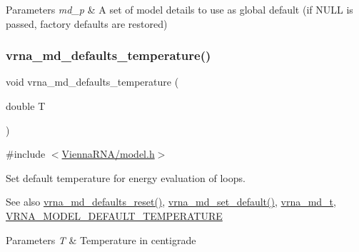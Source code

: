 \begin{DoxyParams}{Parameters}
{\em md\+\_\+p} & A set of model details to use as global default (if N\+U\+LL is passed, factory defaults are restored) \\
\hline
\end{DoxyParams}
\mbox{\label{group__model__details_gaf9e527e9a2f7e6fd6e42bc6e602f5445}} 
\subsubsection{\texorpdfstring{vrna\_md\_defaults\_temperature()}{vrna\_md\_defaults\_temperature()}}
{\footnotesize\ttfamily void vrna\+\_\+md\+\_\+defaults\+\_\+temperature (\begin{DoxyParamCaption}\item[{double}]{T }\end{DoxyParamCaption})}



{\ttfamily \#include $<$\mbox{\hyperlink{model_8h}{Vienna\+R\+N\+A/model.\+h}}$>$}



Set default temperature for energy evaluation of loops. 

\begin{DoxySeeAlso}{See also}
\mbox{\hyperlink{group__model__details_ga70834424cf804d149937de89f80ceb45}{vrna\+\_\+md\+\_\+defaults\+\_\+reset()}}, \mbox{\hyperlink{group__model__details_ga8ac6ff84936282436f822644bf841f66}{vrna\+\_\+md\+\_\+set\+\_\+default()}}, \mbox{\hyperlink{group__model__details_ga1f8a10e12a0a1915f2a4eff0b28ea17c}{vrna\+\_\+md\+\_\+t}}, \mbox{\hyperlink{group__model__details_gaf47f9850b3b4763479f7a7e7a15648a2}{V\+R\+N\+A\+\_\+\+M\+O\+D\+E\+L\+\_\+\+D\+E\+F\+A\+U\+L\+T\+\_\+\+T\+E\+M\+P\+E\+R\+A\+T\+U\+RE}} 
\end{DoxySeeAlso}

\begin{DoxyParams}{Parameters}
{\em T} & Temperature in centigrade \\
\hline
\end{DoxyParams}
\mbox{\label{group__model__details_ga96b24a74437f9ba46c4e06343155bf46}} 
